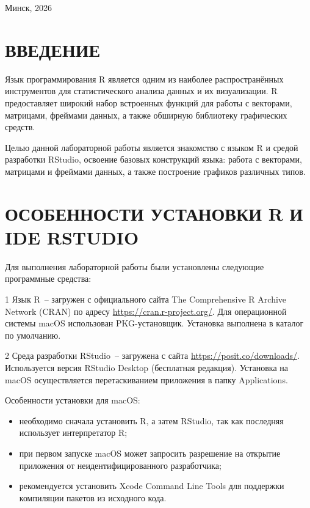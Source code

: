 \documentclass[14pt,a4paper]{extarticle}
\begin{document}
\vfill

\begin{center}
Минск, 2026
\end{center}

\newpage

\tableofcontents
\newpage

\section*{ВВЕДЕНИЕ}

Язык программирования R является одним из наиболее распространённых инструментов для статистического анализа данных и их визуализации. R предоставляет широкий набор встроенных функций для работы с векторами, матрицами, фреймами данных, а также обширную библиотеку графических средств.

Целью данной лабораторной работы является знакомство с языком R и средой разработки RStudio, освоение базовых конструкций языка: работа с векторами, матрицами и фреймами данных, а также построение графиков различных типов.

\newpage

\section{ОСОБЕННОСТИ УСТАНОВКИ R И IDE RSTUDIO}

Для выполнения лабораторной работы были установлены следующие программные средства:

1 Язык R~-- загружен с официального сайта The Comprehensive R Archive Network (CRAN) по адресу \url{https://cran.r-project.org/}. Для операционной системы macOS использован PKG-установщик. Установка выполнена в каталог по умолчанию.

2 Среда разработки RStudio~-- загружена с сайта \url{https://posit.co/downloads/}. Используется версия RStudio Desktop (бесплатная редакция). Установка на macOS осуществляется перетаскиванием приложения в папку Applications.

Особенности установки для macOS:
\begin{itemize}[nosep]
  \item необходимо сначала установить R, а затем RStudio, так как последняя использует интерпретатор R;
  \item при первом запуске macOS может запросить разрешение на открытие приложения от неидентифицированного разработчика;
  \item рекомендуется установить Xcode Command Line Tools для поддержки компиляции пакетов из исходного кода.
\end{itemize}
\end{document}
